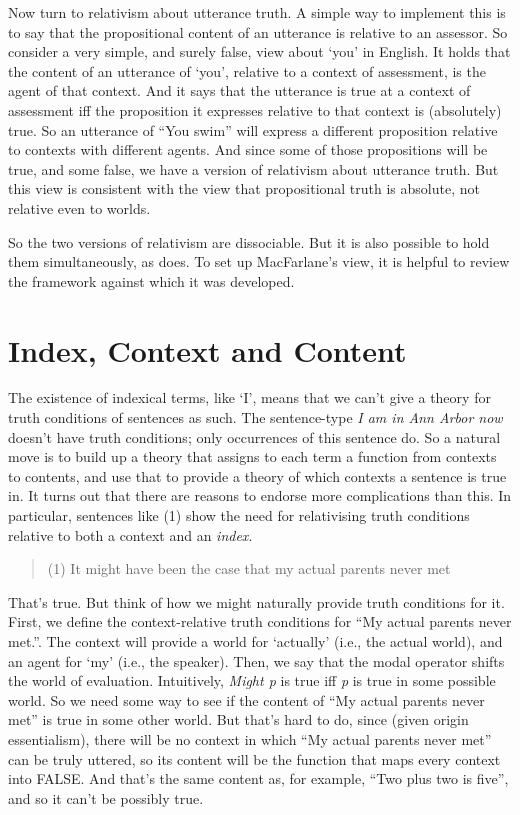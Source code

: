 Now turn to relativism about utterance truth. A simple way to implement this is to say that the propositional content of an utterance is relative to an assessor. So consider a very simple, and surely false, view about `you' in English. It holds that the content of an utterance of `you', relative to a context of assessment, is the agent of that context. And it says that the utterance is true at a context of assessment iff the proposition it expresses relative to that context is (absolutely) true. So an utterance of ``You swim'' will express a different proposition relative to contexts with different agents. And since some of those propositions will be true, and some false, we have a version of relativism about utterance truth. But this view is consistent with the view that propositional truth is absolute, not relative even to worlds.

So the two versions of relativism are dissociable. But it is also possible to hold them simultaneously, as  \citet{MacFarlane2014} does. To set up MacFarlane's view, it is helpful to review the framework against which it was developed.

\section{Index, Context and Content}
\label{indexcontextandcontent}

The existence of indexical terms, like `I', means that we can't give a theory for truth conditions of sentences as such. The sentence-type \emph{I am in Ann Arbor now} doesn't have truth conditions; only occurrences of this sentence do. So a natural move is to build up a theory that assigns to each term a function from contexts to contents, and use that to provide a theory of which contexts a sentence is true in. It turns out that there are reasons to endorse more complications than this. In particular, sentences like (1) show the need for relativising truth conditions relative to both a context and an \emph{index}.

\begin{quote}

(1) It might have been the case that my actual parents never met
\end{quote}
That's true. But think of how we might naturally provide truth conditions for it. First, we define the context-relative truth conditions for ``My actual parents never met.''. The context will provide a world for `actually' (i.e., the actual world), and an agent for `my' (i.e., the speaker). Then, we say that the modal operator shifts the world of evaluation. Intuitively, \emph{Might p} is true iff \emph{p} is true in some possible world. So we need some way to see if the content of ``My actual parents never met'' is true in some other world. But that's hard to do, since (given origin essentialism), there will be no context in which ``My actual parents never met'' can be truly uttered, so its content will be the function that maps every context into FALSE. And that's the same content as, for example, ``Two plus two is five'', and so it can't be possibly true.

